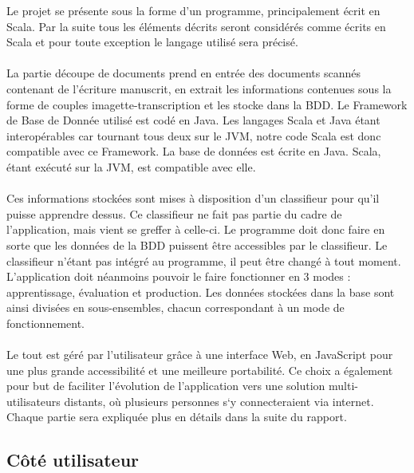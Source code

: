 Le projet se présente sous la forme d’un programme, principalement écrit en Scala. Par la suite tous les éléments décrits seront considérés comme écrits en Scala et pour toute exception le langage utilisé sera précisé.

\paragraph{}

La partie découpe de documents prend en entrée des documents scannés contenant de l’écriture manuscrit, en extrait les informations contenues sous la forme de couples imagette-transcription et les stocke dans la BDD.
Le Framework de Base de Donnée utilisé est codé en Java. Les langages Scala et Java étant interopérables car tournant tous deux sur le JVM, notre code Scala est donc compatible avec ce Framework.
La base de données est écrite en Java. Scala, étant exécuté sur la JVM, est compatible avec elle.

\paragraph{}

Ces informations stockées sont mises à disposition d’un classifieur pour qu’il puisse apprendre dessus. Ce classifieur ne fait pas partie du cadre de l’application, mais vient se greffer à celle-ci. Le programme doit donc faire en sorte que les données de la BDD puissent être accessibles par le classifieur. Le classifieur n’étant pas intégré au programme, il peut être changé à tout moment. L’application doit néanmoins pouvoir le faire fonctionner en 3 modes : apprentissage, évaluation et production.
Les données stockées dans la base sont ainsi divisées en sous-ensembles, chacun correspondant à un mode de fonctionnement.

\paragraph{}

Le tout est géré par l’utilisateur grâce à une interface Web, en JavaScript pour une plus grande accessibilité et une meilleure portabilité. Ce choix a également pour but de faciliter l’évolution de l’application vers une solution multi-utilisateurs distants, où plusieurs personnes s‘y connecteraient via internet.
Chaque partie sera expliquée plus en détails dans la suite du rapport.

\subsection{Côté utilisateur}


